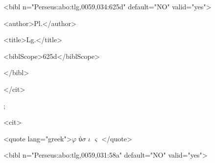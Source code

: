 \documentclass[10pt]{article}
\begin{document}
\begin{adjustwidth}{0.99in}{0.0in}
 <bibl n="Perseus:abo:tlg,0059,034:625d" default="NO" valid="yes">\par

\end{adjustwidth}

\begin{adjustwidth}{1.12in}{0.0in}
 <author>Pl.</author>\par

\end{adjustwidth}

\begin{adjustwidth}{1.12in}{0.0in}
 <title>Lg.</title>\par

\end{adjustwidth}

\begin{adjustwidth}{1.12in}{0.0in}
 <biblScope>625d</biblScope>\par

\end{adjustwidth}

\begin{adjustwidth}{0.99in}{0.0in}
 </bibl>\par

\end{adjustwidth}

\begin{adjustwidth}{0.85in}{0.0in}
 </cit>\par

\end{adjustwidth}

\begin{adjustwidth}{0.85in}{0.0in}
 ;\par

\end{adjustwidth}

\begin{adjustwidth}{0.85in}{0.0in}
 <cit>\par

\end{adjustwidth}

\begin{adjustwidth}{0.99in}{0.0in}
 <quote lang="greek">$ \varphi $ ύ$ \sigma $ $ \iota $ $ \varsigma $ </quote>\par

\end{adjustwidth}

\begin{adjustwidth}{0.99in}{0.0in}
 <bibl n="Perseus:abo:tlg,0059,031:58a" default="NO" valid="yes">\par

\end{adjustwidth}
\end{document}
